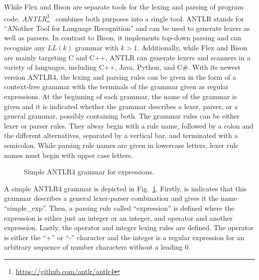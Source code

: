 While Flex and Bison are separate tools for the lexing and parsing of program code, \emph{ANTLR}\footnote{\url{https://github.com/antlr/antlr4}}~\cite{PaQu95} combines both purposes into a single tool. ANTLR stands for ``ANother Tool for Language Recognition'' and can be used to generate lexers as well as parsers. In contrast to Bison, it implements top-down parsing and can recognize any $LL(k)$ grammar with $k > 1$. Additionally, while Flex and Bison are mainly targeting C and C++, ANTLR can generate lexers and scanners in a variety of languages, including C++, Java, Python, and C\#.
With its newest version ANTLR4, the lexing and parsing rules can be given in the form of a context-free grammar with the terminals of the grammar given as regular expressions. At the beginning of each grammar, the name of the grammar is given and it is indicated whether the grammar describes a lexer, parser, or a general grammar, possibly containing both. The grammar rules can be either lexer or parser rules. They alway begin with a rule name, followed by a colon and the different alternatives, separated by a vertical bar, and terminated with a semicolon. While parsing rule names are given in lowercase letters, lexer rule names must begin with upper case letters.

\begin{figure}[htp]
    \centering
    
    \caption{Simple ANTLR4 grammar for expressions.}
    \label{fig:example_antlr4}
\end{figure}

A simple ANTLR4 grammar is depicted in Fig.~\ref{fig:example_antlr4}. Firstly, is indicates that this grammar describes a general lexer-parser combination and gives it the name \mbox{``simple\_exp''}. Then, a parsing rule called ``expression'' is defined where the expression is either just an integer or an integer, and operator and another expression. Lastly, the operator and integer lexing rules are defined. The operator is either the ``+'' or ``-'' character and the integer is a regular expression for an arbitrary sequence of number characters without a leading $0$.